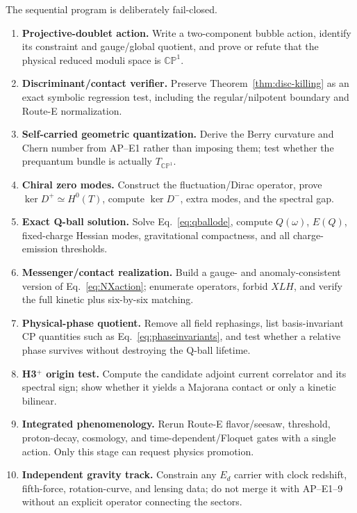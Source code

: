 \documentclass[11pt]{article}
\numberwithin{equation}{section}
\newcommand{\CP}{\mathbb{CP}}
\begin{document}
The sequential program is deliberately fail-closed.

\begin{enumerate}[label=\textbf{AP--E\arabic*.}]
\item \textbf{Projective-doublet action.}  Write a two-component bubble
action, identify its constraint and gauge/global quotient, and prove or refute
that the physical reduced moduli space is \(\CP^1\).
\item \textbf{Discriminant/contact verifier.}  Preserve
Theorem~\ref{thm:disc-killing} as an exact symbolic regression test, including
the regular/nilpotent boundary and Route-E normalization.
\item \textbf{Self-carried geometric quantization.}  Derive the Berry
curvature and Chern number from AP--E1 rather than imposing them; test whether
the prequantum bundle is actually \(T_{\CP^1}\).
\item \textbf{Chiral zero modes.}  Construct the fluctuation/Dirac operator,
prove \(\ker D^+\simeq H^0(T)\), compute \(\ker D^-\), extra modes, and the
spectral gap.
\item \textbf{Exact Q-ball solution.}  Solve Eq.~\eqref{eq:qballode}, compute
\(Q(\omega)\), \(E(Q)\), fixed-charge Hessian modes, gravitational
compactness, and all charge-emission thresholds.
\item \textbf{Messenger/contact realization.}  Build a gauge- and
anomaly-consistent version of Eq.~\eqref{eq:NXaction}; enumerate operators,
forbid \(XLH\), and verify the full kinetic plus six-by-six matching.
\item \textbf{Physical-phase quotient.}  Remove all field rephasings, list
basis-invariant CP quantities such as Eq.~\eqref{eq:phaseinvariants}, and test
whether a relative phase survives without destroying the Q-ball lifetime.
\item \textbf{H3$^+$ origin test.}  Compute the candidate adjoint current
correlator and its spectral sign; show whether it yields a Majorana contact or
only a kinetic bilinear.
\item \textbf{Integrated phenomenology.}  Rerun Route-E flavor/seesaw,
threshold, proton-decay, cosmology, and time-dependent/Floquet gates with a
single action.  Only this stage can request physics promotion.
\item \textbf{Independent gravity track.}  Constrain any \(E_d\) carrier with
clock redshift, fifth-force, rotation-curve, and lensing data; do not merge it
with AP--E1--9 without an explicit operator connecting the sectors.
\end{enumerate}
\end{document}
